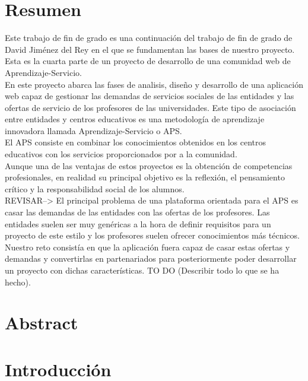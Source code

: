 \documentclass{article}
\begin{document}
\section{Resumen}
Este trabajo de fin de grado es una continuación del trabajo de fin de grado de David Jiménez del Rey en el que se fundamentan las bases de nuestro proyecto. 
Esta es la cuarta parte de un proyecto de desarrollo de una comunidad web de Aprendizaje-Servicio.\\
En este proyecto abarca las fases de analisis, diseño y desarrollo de una aplicación web capaz de gestionar las demandas de servicios sociales de las entidades y las ofertas de servicio de los profesores de las universidades.
Este tipo de asociación entre entidades y centros educativos es una metodología de aprendizaje innovadora llamada Aprendizaje-Servicio o APS.\\
El APS consiste en combinar los conocimientos obtenidos en los centros educativos con los servicios proporcionados por a la comunidad.\\
Aunque una de las ventajas de estos proyectos es la obtención de competencias profesionales, en realidad su principal objetivo es la reflexión, el pensamiento crítico y la responsabilidad social de los alumnos.\\
REVISAR-->
El principal problema de una plataforma orientada para el APS es casar las demandas de las entidades con las ofertas de los profesores. Las entidades suelen ser muy genéricas a la hora de definir requisitos para un proyecto de este estilo y los profesores suelen ofrecer conocimientos más técnicos. Nuestro reto consistía en que la aplicación fuera capaz de casar estas ofertas y demandas y convertirlas en partenariados para posteriormente poder desarrollar un proyecto con dichas características.
TO DO (Describir todo lo que se ha hecho).
\newpage

\section{Abstract}
\newpage
\section{Introducción}

\end{document}

